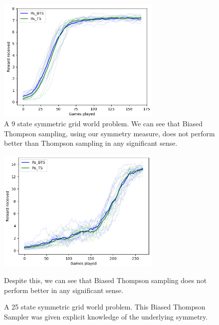 



\begin{figure}[h!]
  \centering
  \includegraphics[width=0.7\textwidth,height=0.35\textheight]{../../pictures/figures/mdp-9-implicit.png}
  \caption{A 9 state symmetric grid world problem.
	We can see that Biased Thompson sampling, using our symmetry measure, does not perform better than Thompson sampling in any significant sense.}
\end{figure}

\begin{figure}[h!]
  \centering
  \includegraphics[width=0.7\textwidth,height=0.35\textheight]{../../pictures/figures/mdp-25-explicit.png}
  \caption{A 25 state symmetric grid world problem.
	This Biased Thompson Sampler was given explicit knowledge of the underlying symmetry.}
	Despite this, we can see that Biased Thompson sampling does not perform better in any significant sense.
	\label{fig:explicit-sym}
\end{figure}

